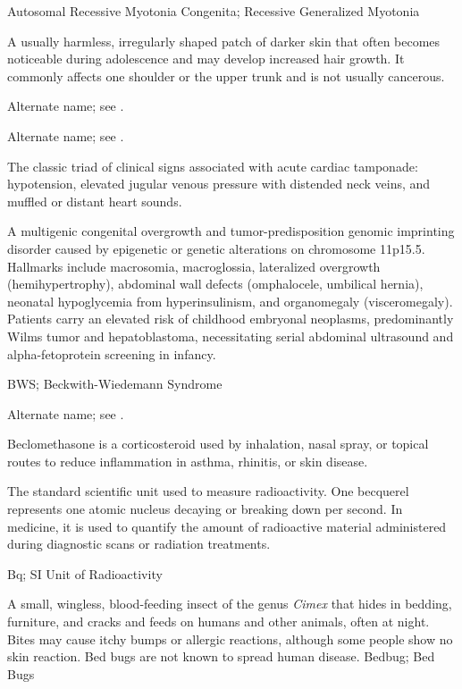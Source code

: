 \synonyms
Autosomal Recessive Myotonia Congenita; Recessive Generalized Myotonia

 A usually harmless, irregularly shaped patch of darker skin that often becomes noticeable during adolescence and may develop increased hair growth. It commonly affects one shoulder or the upper trunk and is not usually cancerous.

 Alternate name; see .

 Alternate name; see .

 The classic triad of clinical signs associated with acute cardiac tamponade: hypotension, elevated jugular venous pressure with distended neck veins, and muffled or distant heart sounds.

 A multigenic congenital overgrowth and tumor-predisposition genomic imprinting disorder caused by epigenetic or genetic alterations on chromosome 11p15.5. Hallmarks include macrosomia, macroglossia, lateralized overgrowth (hemihypertrophy), abdominal wall defects (omphalocele, umbilical hernia), neonatal hypoglycemia from hyperinsulinism, and organomegaly (visceromegaly). Patients carry an elevated risk of childhood embryonal neoplasms, predominantly Wilms tumor and hepatoblastoma, necessitating serial abdominal ultrasound and alpha-fetoprotein screening in infancy.

\synonyms
BWS; Beckwith-Wiedemann Syndrome

 Alternate name; see .

 Beclomethasone is a corticosteroid used by inhalation, nasal spray, or topical routes to reduce inflammation in asthma, rhinitis, or skin disease.

 The standard scientific unit used to measure radioactivity. One becquerel represents one atomic nucleus decaying or breaking down per second. In medicine, it is used to quantify the amount of radioactive material administered during diagnostic scans or radiation treatments.

\synonyms
Bq; SI Unit of Radioactivity

 A small, wingless, blood-feeding insect of the genus \textit{Cimex} that hides in
bedding, furniture, and cracks and feeds on humans and other animals, often at night.
Bites may cause itchy bumps or allergic reactions, although some people show no skin
reaction. Bed bugs are not known to spread human disease.
\synonyms
Bedbug; Bed Bugs

